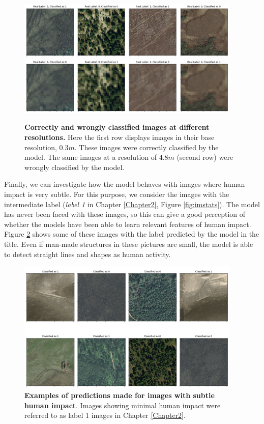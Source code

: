 \begin{figure}[H]
	\centering
	\captionsetup{width=1\linewidth}
	\includegraphics[width=0.95\textwidth]{Figures/results/class_dataset03m_res03_comp_correct.png}
	\includegraphics[width=0.95\textwidth]{Figures/results/class_dataset03m_res48_comp_wrong.png}
	\caption{\textbf{Correctly and wrongly classified images at different resolutions.} Here the first row displays images in their base resolution, $0.3m$. These images were correctly classified by the model. The same images at a resolution of $4.8m$ (second row) were wrongly classified by the model.}
	\label{fig:dataset03m_res03_res48_comp}
\end{figure}

Finally, we can investigate how the model behaves with images where human impact is very subtle. For this purpose, we consider the images with the intermediate label (\textit{label 1} in Chapter \ref{Chapter2}, Figure \ref{fig:imstats}). The model has never been faced with these images, so this can give a good perception of whether the models have been able to learn relevant features of human impact. Figure \ref{fig:dataset03m_res03_l1} shows some of these images with the label predicted by the model in the title. Even if man-made structures in these pictures are small, the model is able to detect straight lines and shapes as human activity. 

\begin{figure}[H]
	\centering
	\captionsetup{width=1\linewidth}
	\includegraphics[width=0.95\textwidth]{Figures/results/class_dataset03m_res03_l1.png}
	\caption{\textbf{Examples of predictions made for images with subtle human impact}. Images showing minimal human impact were referred to as label 1 images in Chapter \ref{Chapter2}.}
	\label{fig:dataset03m_res03_l1}
\end{figure}

